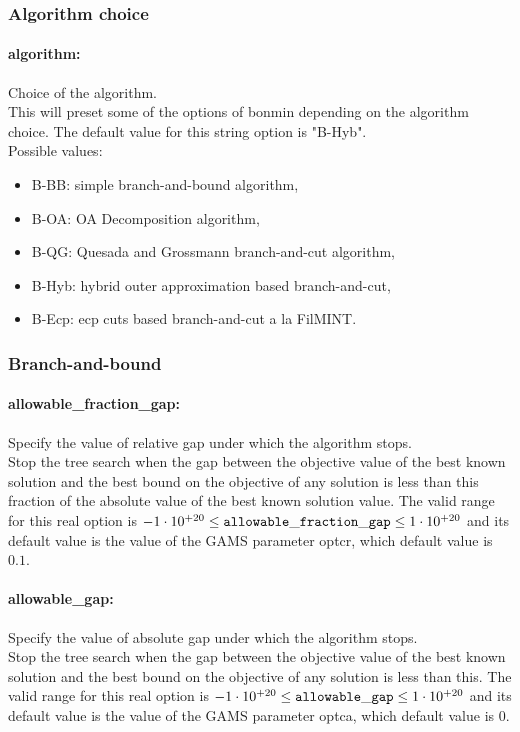 \subsubsection{Algorithm choice}
\label{sec:Bonmin_algorithm_choice}
\paragraph{algorithm:} Choice of the algorithm. $\;$ \\
 This will preset some of the options of bonmin
depending on the algorithm choice.
The default value for this string option is "B-Hyb".
\\ 
Possible values:
\begin{itemize}
   \item B-BB: simple branch-and-bound algorithm,
   \item B-OA: OA Decomposition algorithm,
   \item B-QG: Quesada and Grossmann branch-and-cut algorithm,
   \item B-Hyb: hybrid outer approximation based branch-and-cut,
   \item B-Ecp: ecp cuts based branch-and-cut a la FilMINT.
\end{itemize}

\subsubsection{Branch-and-bound}
\label{sec:bonmin_branch-and-bound_options}
\paragraph{allowable\_fraction\_gap:} Specify the value of relative gap under which the algorithm stops. $\;$ \\
 Stop the tree search when the gap between the
objective value of the best known solution and
the best bound on the objective of any solution
is less than this fraction of the absolute value
of the best known solution value. The valid range for this real option is 
$-1 \cdot 10^{+20} \le {\tt allowable\_fraction\_gap } \le 1 \cdot 10^{+20}$
and its default value is the value of the GAMS parameter optcr, which default value is $0.1$.


\paragraph{allowable\_gap:} Specify the value of absolute gap under which the algorithm stops. $\;$ \\
 Stop the tree search when the gap between the
objective value of the best known solution and
the best bound on the objective of any solution
is less than this. The valid range for this real option is 
$-1 \cdot 10^{+20} \le {\tt allowable\_gap } \le 1 \cdot 10^{+20}$
and its default value is the value of the GAMS parameter optca, which default value is $0$.


